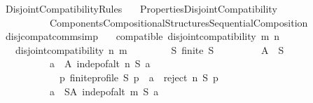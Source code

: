 %
\begin{isabellebody}%
%
%
\isadelimtheory
%
\endisadelimtheory
%
\isatagtheory
{}\isamarkupfalse%
\ Disjoint{\isacharunderscore}{\kern0pt}Compatibility{\isacharunderscore}{\kern0pt}Rules\isanewline
\ \ \ {\isachardoublequoteopen}{\isachardot}{\kern0pt}{\isachardot}{\kern0pt}{\isacharslash}{\kern0pt}Properties{\isacharslash}{\kern0pt}Disjoint{\isacharunderscore}{\kern0pt}Compatibility{\isachardoublequoteclose}\isanewline
\ \ \ \ \ \ \ \ \ \ {\isachardoublequoteopen}{\isachardot}{\kern0pt}{\isachardot}{\kern0pt}{\isacharslash}{\kern0pt}Components{\isacharslash}{\kern0pt}Compositional{\isacharunderscore}{\kern0pt}Structures{\isacharslash}{\kern0pt}Sequential{\isacharunderscore}{\kern0pt}Composition{\isachardoublequoteclose}\isanewline
\isanewline
{}%
\endisatagtheory
{\isafoldtheory}%
%
\isadelimtheory
\isanewline
%
\endisadelimtheory
\isanewline
\isanewline
{}\isamarkupfalse%
\ disj{\isacharunderscore}{\kern0pt}compat{\isacharunderscore}{\kern0pt}comm{\isacharbrackleft}{\kern0pt}simp{\isacharbrackright}{\kern0pt}{\isacharcolon}{\kern0pt}\isanewline
\ \ \ compatible{\isacharcolon}{\kern0pt}\ {\isachardoublequoteopen}disjoint{\isacharunderscore}{\kern0pt}compatibility\ m\ n{\isachardoublequoteclose}\isanewline
\ \ \ {\isachardoublequoteopen}disjoint{\isacharunderscore}{\kern0pt}compatibility\ n\ m{\isachardoublequoteclose}\isanewline
%
\isadelimproof
%
\endisadelimproof
%
\isatagproof
{}\isamarkupfalse%
\ {\isacharminus}{\kern0pt}\isanewline
\ \ \isamarkupfalse%
\isanewline
\ \ \ \ {\isachardoublequoteopen}{\isasymforall}S{\isachardot}{\kern0pt}\ finite\ S\ {\isasymlongrightarrow}\isanewline
\ \ \ \ \ \ \ \ {\isacharparenleft}{\kern0pt}{\isasymexists}A\ {\isasymsubseteq}\ S{\isachardot}{\kern0pt}\isanewline
\ \ \ \ \ \ \ \ \ \ {\isacharparenleft}{\kern0pt}{\isasymforall}a\ {\isasymin}\ A{\isachardot}{\kern0pt}\ indep{\isacharunderscore}{\kern0pt}of{\isacharunderscore}{\kern0pt}alt\ n\ S\ a\ {\isasymand}\isanewline
\ \ \ \ \ \ \ \ \ \ \ \ {\isacharparenleft}{\kern0pt}{\isasymforall}p{\isachardot}{\kern0pt}\ finite{\isacharunderscore}{\kern0pt}profile\ S\ p\ {\isasymlongrightarrow}\ a\ {\isasymin}\ reject\ n\ S\ p{\isacharparenright}{\kern0pt}{\isacharparenright}{\kern0pt}\ {\isasymand}\isanewline
\ \ \ \ \ \ \ \ \ \ {\isacharparenleft}{\kern0pt}{\isasymforall}a\ {\isasymin}\ S{\isacharminus}{\kern0pt}A{\isachardot}{\kern0pt}\ indep{\isacharunderscore}{\kern0pt}of{\isacharunderscore}{\kern0pt}alt\ m\ S\ a\ {\isasymand}\isanewline

\end{isabellebody}

